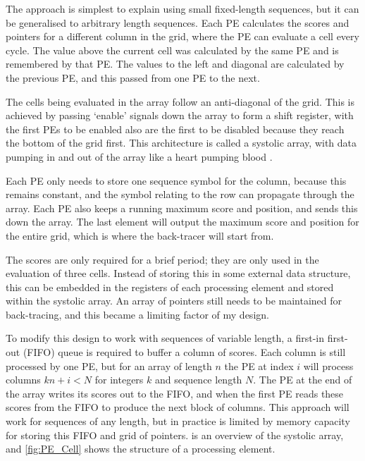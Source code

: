 The approach is simplest to explain using small fixed-length sequences, but it can be generalised to arbitrary length sequences.
Each PE calculates the scores and pointers for a different column in the grid, where the PE can evaluate a cell every cycle.
The value above the current cell was calculated by the same PE and is remembered by that PE.
The values to the left and diagonal are calculated by the previous PE, and this passed from one PE to the next.

The cells being evaluated in the array follow an anti-diagonal of the grid.
This is achieved by passing `enable' signals down the array to form a shift register, with the first PEs to be enabled also are the first to be disabled because they reach the bottom of the grid first.
This architecture is called a systolic array, with data pumping in and out of the array like a heart pumping blood \cite{SystolicArrays}.

Each PE only needs to store one sequence symbol for the column, because this remains constant, and the symbol relating to the row can propagate through the array.
Each PE also keeps a running maximum score and position, and sends this down the array.
The last element will output the maximum score and position for the entire grid, which is where the back-tracer will start from.

The scores are only required for a brief period; they are only used in the evaluation of three cells. Instead of storing this in some external data structure, this can be embedded in the registers of each processing element and stored within the systolic array.
An array of pointers still needs to be maintained for back-tracing, and this became a limiting factor of my design.

To modify this design to work with sequences of variable length, a first-in first-out (FIFO) queue is required to buffer a column of scores.
Each column is still processed by one PE, but for an array of length $n$ the PE at index $i$ will process columns $kn+i < N$ for integers $k$ and sequence length $N$.
The PE at the end of the array writes its scores out to the FIFO, and when the first PE reads these scores from the FIFO to produce the next block of columns.
This approach will work for sequences of any length, but in practice is limited by memory capacity for storing this FIFO and grid of pointers.
 is an overview of the systolic array, and \cref{fig:PE_Cell} shows the structure of a processing element.

